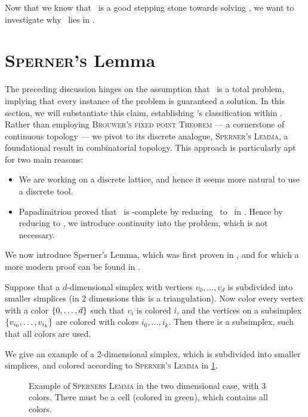 Now that we know that \Tarskistar\ is a good stepping stone towards solving \Tarski, we want to investigate why \Tarskistar\ lies in \PPAD.

\section{\textsc{Sperner's} Lemma}

The preceding discussion hinges on the assumption that \Tarskistar\ is a total problem, implying that every instance of the problem is guaranteed a solution. In this section, we will substantiate this claim, establishing \Tarskistar's classification within \TFNP. Rather than employing \textsc{Brouwer's fixed point Theorem} --- a cornerstone of continuous topology --- we pivot to its discrete analogue, \textsc{Sperner’s Lemma}, a foundational result in combinatorial topology. This approach is particularly apt for two main reasons:
\begin{itemize}
    \item We are working on a discrete lattice, and hence it seems more natural to use a discrete tool.
    \item Papadimitriou proved that \Brouwer\ is \PPAD-complete by reducing \Brouwer\ to \Sperner\ in . Hence by reducing to \Brouwer, we introduce continuity into the problem, which is not necessary.
\end{itemize}

We now introduce Sperner's Lemma, which was first proven in , and for which a more modern proof can be found in .
\begin{theorem}
    Suppose that a $d$-dimensional simplex with vertices $v_0, \dots, v_d$ is subdivided into smaller simplices (in 2 dimensions this is a triangulation). Now color every vertex with a color $\left\{0, \dots, d\right\}$ such that $v_i$ is colored $i$, and the vertices on a subsimplex $\left\{v_{i_0}, \dots, v_{i_k}\right\}$ are colored with colors $i_0, \dots, i_k$. Then there is a subsimplex, such that all colors are used.
\end{theorem}

We give an example of a 2-dimensional simplex, which is subdivided into smaller simplices, and colored according to \textsc{Sperner's Lemma} in \cref{fig:sperner_lemma_example}.

\begin{figure}[ht]
    \centering
    \caption[Example of \textsc{Sperners Lemma}]{Example of \textsc{Sperners Lemma} in the two dimensional case, with 3 colors. There must be a cell (colored in green), which contains all colors.}
    \label{fig:sperner_lemma_example}
\end{figure}

